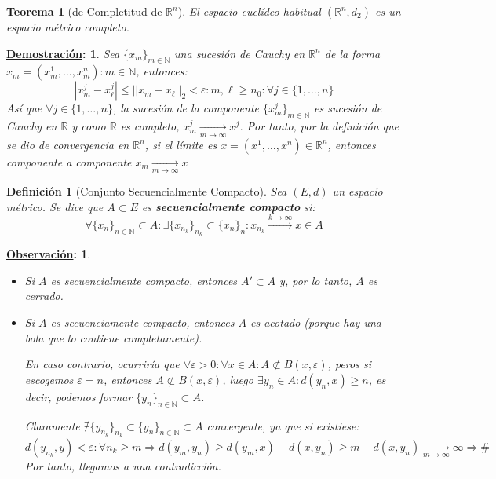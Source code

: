 \documentclass[10pt,a4paper,openright]{book}
\theoremstyle{break}
\newtheorem*{defi}{Definición}
\newtheorem*{theo}{Teorema}
\newtheorem*{demo}{\underline{Demostración}:}
\newtheorem*{obs}{\underline{Observación}:}
\begin{document}
\begin{theo}[de Completitud de $\mathbb{R}^n$]
El espacio euclídeo habitual $(\mathbb{R}^n, d_2)$ es un espacio métrico completo.
\end{theo}

\begin{demo}
Sea $\{x_m\}_{m\in \mathbb{N}}$ una sucesión de Cauchy en $\mathbb{R}^n$ de la forma $x_m = (x_m^1, \ldots , x_m^n) : m \in \mathbb{N}$, entonces:
$$|x_m^j - x_\ell^j| \leq ||x_m - x_\ell ||_2 < \varepsilon : m,\ell \geq n_0 : \forall j \in \{ 1, \ldots,n\}$$
Así que $\forall j \in \{ 1, \ldots,n\}$, la sucesión de la componente $\{x_m^j\}_{m \in \mathbb{N}}$ es sucesión de Cauchy en $\mathbb{R}$ y como $\mathbb{R}$ es completo, $x_m^j \xrightarrow[m\rightarrow\infty]{} x^j$. Por tanto, por la definición que se dio de convergencia en $\mathbb{R}^{n}$, si el límite es $x=(x^1, \ldots, x^n) \in \mathbb{R}^n$, entonces componente a componente $x_m \xrightarrow[m\rightarrow\infty]{} x$
\end{demo}

\begin{defi}[Conjunto Secuencialmente Compacto]
Sea $(E,d)$ un espacio métrico. Se dice que $A \subset E$ es \textbf{secuencialmente compacto} si:
$$\forall \{x_n\}_{n \in \mathbb{N}} \subset A : \exists \{ x_{n_k}\}_{n_k} \subset \{ x_n\}_n : x_{n_{k}}\xrightarrow{k\rightarrow\infty} x \in A$$
\end{defi}

\begin{obs}
\begin{itemize}
\item Si $A$ es secuencialmente compacto, entonces $A' \subset A$ y, por lo tanto,  $A$ es cerrado.

\item Si $A$ es secuenciamente compacto, entonces $A$ es acotado (porque hay una bola que lo contiene completamente). 

En caso contrario, ocurriría que $\forall \varepsilon > 0 : \forall x \in A: A \not\subset B(x,\varepsilon)$, peros si escogemos $\varepsilon = n$, entonces $A\not\subset B(x,\varepsilon)$, luego $\exists y_n \in A : d(y_n,x) \geq n$, es decir, podemos formar $\{y_n\}_{n\in \mathbb{N}}\subset A$.

Claramente $\nexists \{ y_{n_k}\}_{n_k} \subset \{ y_n\}_{n \in \mathbb{N}}\subset A$ convergente, ya que si existiese:
$$d(y_{n_k}, y) < \varepsilon : \forall n_k \geq m \Rightarrow d(y_m, y_n) \geq d(y_m,x) - d(x, y_n) \geq m - d(x, y_n) \xrightarrow[m\rightarrow\infty]{} \infty \Rightarrow \#$$
Por tanto, llegamos a una contradicción.
\end{itemize}
\end{obs}
\end{document}
